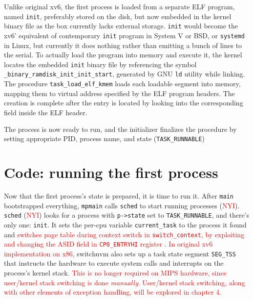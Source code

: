 \documentclass{report}
\def \hilite#1{\textcolor{red}{#1}}
\newenvironment{hilight}{\color{red}}{\color{black}}
\begin{document}
\begin{hilight}
		Unlike original xv6, the first process is loaded from a separate ELF program, named \texttt{init},
		preferably stored on the disk, but now embedded in the kernel binary file as the box currently lacks
		external storage.
		\texttt{init} would become the xv6' equivalent of contemporary \texttt{init}
		program in System V or BSD, or \texttt{systemd} in Linux, but currently it does nothing rather than
		emitting a bunch of lines to the serial.
		\marginpar{
			\footnotesize\ttfamily
			\textcolor{red}{ramdisk/init/init.c}
		}
		To actually load the program into memory and execute it, the kernel locates the embedded
		\texttt{init} binary file by referencing the symbol \texttt{\_binary\_ramdisk\_init\_init\_start},
		\marginpar{
			\footnotesize\ttfamily
			\textcolor{red}{kern/sched/task.c:113}
		}
		generated by GNU \texttt{ld} utility while linking.  The procedure \texttt{task\_load\_elf\_kmem}
		\marginpar{
			\footnotesize\ttfamily
			\textcolor{red}{kern/syscall/\\execve.c:118}
		}
		loads each loadable segment into memory, mapping them to virtual address specified by the ELF
		program headers.  The creation is complete after the entry is located by looking into the
		corresponding field inside the ELF header.

		The process is now ready to run, and the initializer finalizes the procedure by setting appropriate
		PID, process name, and state (\texttt{TASK\_RUNNABLE})
	\end{hilight}
	
	\section{Code: running the first process}
	Now that the first process's state is prepared, it is time to run it. After \texttt{main} bootstrapped
	everything, \texttt{mpmain} calls \texttt{sched}
	\marginpar{
		\footnotesize\ttfamily
		\hilite{kern/sched/sched.c}
	} to start running processes (\hilite{NYI}). 
	\texttt{sched} (\hilite{NYI})
	looks for a process with \texttt{p->state} set to \texttt{TASK\_RUNNABLE}, and there’s only one:
	\texttt{init}. It
	sets the per-cpu variable \texttt{current\_task}
	\marginpar{
		\footnotesize\ttfamily
		\hilite{arch/mips/include/\\asm/thread\_info.h:47}
	}
	to the process it found and \hilite{
		switches page table during context switch in \texttt{switch\_context},
		\marginpar{
			\footnotesize\ttfamily
			\hilite{arch/mips/sched/switch.S}
		} by exploiting and changing the ASID field in \texttt{CP0\_ENTRYHI}
		register
	}. \hilite{In original xv6 implementation on x86,} switchuvm also sets up a task
	state segment \texttt{SEG\_TSS} that instructs the hardware to execute system calls and 
	interrupts on the process’s kernel stack. \hilite{
		This is no longer required on MIPS hardware, since user/kernel stack switching is done
		\emph{manually}.  User/kernel stack switching, along with other elements of exception
		handling, will be explored in chapter 4.
	}
	
\end{document}
